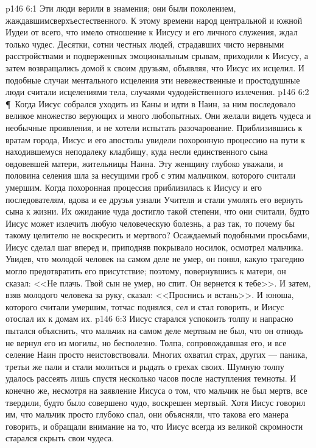 \vs p146 6:1 Эти люди верили в знамения; они были поколением, жаждавшимсверхъестественного. К этому времени народ центральной и южной Иудеи от всего, что имело отношение к Иисусу и его личного служения, ждал только чудес. Десятки, сотни честных людей, страдавших чисто нервными расстройствами и подверженных эмоциональным срывам, приходили к Иисусу, а затем возвращались домой к своим друзьям, объявляя, что Иисус их исцелил. И подобные случаи ментального исцеления эти невежественные и простодушные люди считали исцелениями тела, случаями чудодейственного излечения.
\vs p146 6:2 \P\ Когда Иисус собрался уходить из Каны и идти в Наин, за ним последовало великое множество верующих и много любопытных. Они желали видеть чудеса и необычные проявления, и не хотели испытать разочарование. Приблизившись к вратам города, Иисус и его апостолы увидели похоронную процессию на пути к находившемуся неподалеку кладбищу, куда несли единственного сына овдовевшей матери, жительницы Наина. Эту женщину глубоко уважали, и половина селения шла за несущими гроб с этим мальчиком, которого считали умершим. Когда похоронная процессия приблизилась к Иисусу и его последователям, вдова и ее друзья узнали Учителя и стали умолять его вернуть сына к жизни. Их ожидание чуда достигло такой степени, что они считали, будто Иисус может излечить любую человеческую болезнь, а раз так, то почему бы такому целителю не воскресить и мертвого? Осаждаемый подобными просьбами, Иисус сделал шаг вперед и, приподняв покрывало носилок, осмотрел мальчика. Увидев, что молодой человек на самом деле не умер, он понял, какую трагедию могло предотвратить его присутствие; поэтому, повернувшись к матери, он сказал: <<Не плачь. Твой сын не умер, но спит. Он вернется к тебе>>. И затем, взяв молодого человека за руку, сказал: <<Проснись и встань>>. И юноша, которого считали умершим, тотчас поднялся, сел и стал говорить, и Иисус отослал их к домам их.
\vs p146 6:3 Иисус старался успокоить толпу и напрасно пытался объяснить, что мальчик на самом деле мертвым не был, что он отнюдь не вернул его из могилы, но бесполезно. Толпа, сопровождавшая его, и все селение Наин просто неистовствовали. Многих охватил страх, других --- паника, третьи же пали и стали молиться и рыдать о грехах своих. Шумную толпу удалось рассеять лишь спустя несколько часов после наступления темноты. И конечно же, несмотря на заявление Иисуса о том, что мальчик не был мертв, все твердили, будто было совершено чудо, воскрешен мертвый. Хотя Иисус говорил им, что мальчик просто глубоко спал, они объясняли, что такова его манера говорить, и обращали внимание на то, что Иисус всегда из великой скромности старался скрыть свои чудеса.
